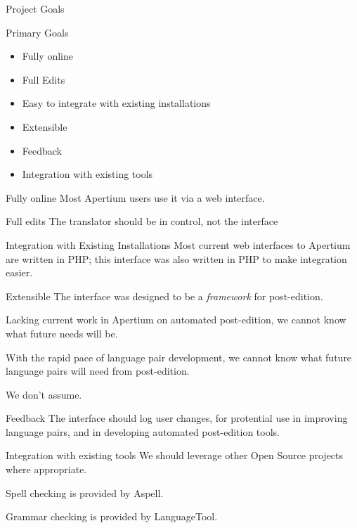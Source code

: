 \documentclass{beamer}
\begin{document}
\begin{section}{Project Goals}
\begin{frame}{Primary Goals}
\begin{itemize}
\item Fully online
\item Full Edits
\item Easy to integrate with existing installations
\item Extensible
\item Feedback
\item Integration with existing tools
\end{itemize}
\end{frame}

\begin{frame}{Fully online}
Most Apertium users use it via a web interface.
\end{frame}

\begin{frame}{Full edits}
The translator should be in control, not the interface
\end{frame}

\begin{frame}{Integration with Existing Installations}
Most current web interfaces to Apertium are written in PHP; this
interface was also written in PHP to make integration easier.
\end{frame}

\begin{frame}{Extensible}
The interface was designed to be a {\it framework} for post-edition.

Lacking current work in Apertium on automated post-edition, we cannot
know what future needs will be.

With the rapid pace of language pair development, we cannot know what
future language pairs will need from post-edition.

We don't assume.
\end{frame}

\begin{frame}{Feedback}
The interface should log user changes, for protential use in 
improving language pairs, and in developing automated post-edition tools.
\end{frame}

\begin{frame}{Integration with existing tools}
We should leverage other Open Source projects where appropriate.

Spell checking is provided by Aspell.

Grammar checking is provided by LanguageTool.
\end{frame}
\end{section}
\end{document}
